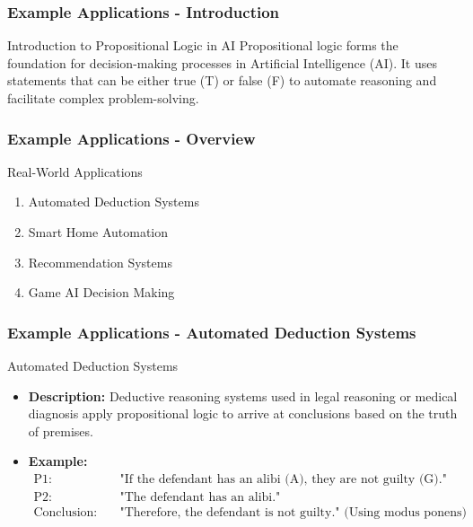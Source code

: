 \documentclass[aspectratio=169]{beamer}
\begin{document}
\begin{frame}[fragile]
    \frametitle{Example Applications - Introduction}
    \begin{block}{Introduction to Propositional Logic in AI}
        Propositional logic forms the foundation for decision-making processes in Artificial Intelligence (AI). It uses statements that can be either true (T) or false (F) to automate reasoning and facilitate complex problem-solving.
    \end{block}
\end{frame}

\begin{frame}[fragile]
    \frametitle{Example Applications - Overview}
    \begin{block}{Real-World Applications}
        \begin{enumerate}
            \item Automated Deduction Systems
            \item Smart Home Automation
            \item Recommendation Systems
            \item Game AI Decision Making
        \end{enumerate}
    \end{block}
\end{frame}

\begin{frame}[fragile]
    \frametitle{Example Applications - Automated Deduction Systems}
    \begin{block}{Automated Deduction Systems}
        \begin{itemize}
            \item \textbf{Description:} Deductive reasoning systems used in legal reasoning or medical diagnosis apply propositional logic to arrive at conclusions based on the truth of premises.
            \item \textbf{Example:}
            \begin{align*}
                \text{P1:} & \quad \text{"If the defendant has an alibi (A), they are not guilty (G)."} \\
                \text{P2:} & \quad \text{"The defendant has an alibi."} \\
                \text{Conclusion:} & \quad \text{"Therefore, the defendant is not guilty." (Using modus ponens)}
            \end{align*}
        \end{itemize}
    \end{block}
\end{frame}
\end{document}
